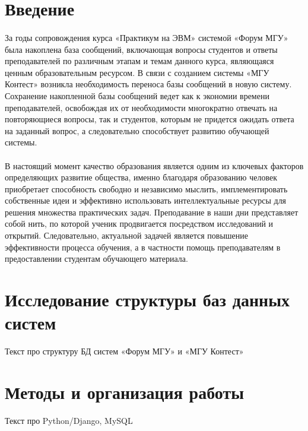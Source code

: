 \documentclass[12pt, a4paper, oneside]{article}
\begin{document}
    \tableofcontents
    \newpage
    
    \section*{Введение}
        \paragraph{} %
        За годы сопровождения курса «Практикум на ЭВМ» системой «Форум МГУ» была накоплена база сообщений, включающая вопросы студентов и ответы преподавателей по различным этапам и темам данного курса, являющаяся ценным образовательным ресурсом. В связи с созданием системы «МГУ Контест» возникла необходимость переноса базы сообщений в новую систему. Сохранение накопленной базы сообщений ведет как к экономии времени преподавателей, освобождая их от необходимости многократно отвечать на повторяющиеся вопросы, так и студентов, которым не придется ожидать ответа на заданный вопрос, а следовательно способствует развитию обучающей системы.
        \paragraph{} %
        В настоящий момент качество образования является одним из ключевых факторов определяющих развитие общества, именно благодаря образованию человек приобретает способность свободно и независимо мыслить, имплементировать собственные идеи и эффективно использовать интеллектуальные ресурсы для решения множества практических задач. Преподавание в наши дни представляет собой нить, по которой ученик продвигается посредством исследований и открытий. Следовательно, актуальной задачей является повышение эффективности процесса обучения, а в частности помощь преподавателям в предоставлении студентам обучающего материала.
    \newpage
    
    \section{Исследование структуры баз данных систем}
        Текст про структуру БД систем «Форум МГУ» и «МГУ Контест»
    \newpage
    
    \section{Методы и организация работы}
    Текст про Python/Django, MySQL
    \newpage
    
\end{document}
